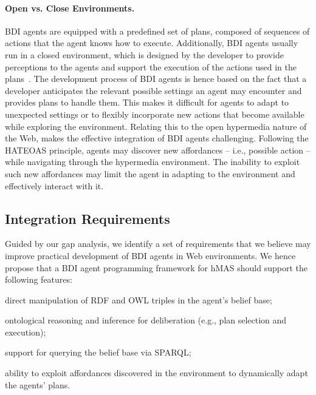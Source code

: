 \documentclass[
]{ceurart}
\begin{document}
\paragraph{Open vs. Close Environments.}

\ac{BDI} agents are equipped with a predefined set of plans, composed of sequences of actions that the agent knows how to execute.
%
Additionally, \ac{BDI} agents usually run in a closed environment,
which is designed by the developer to provide perceptions to the agents and
support the execution of the actions used in the plans~\cite{weyns2007aamas}.
%
The development process of \ac{BDI} agents is hence based on the fact that a developer anticipates
the relevant possible settings an agent may encounter and provides plans to handle them.
%
This makes it difficult for agents to adapt to unexpected settings or to flexibly incorporate new actions that become available while exploring the environment.
%
Relating this to the open hypermedia nature of the Web, makes the effective integration of \ac{BDI} agents challenging.
%
Following the \ac{HATEOAS} principle, agents may discover new affordances
-- i.e., possible action --
while navigating through the hypermedia environment.
%
The inability to exploit such new affordances may limit the agent in adapting to the environment and effectively interact with it.

\subsection{Integration Requirements}
\label{sec:integrating-bdi-hypermedia}

Guided by our gap analysis,
we identify a set of requirements that we believe may improve practical development of \ac{BDI} agents in Web environments.
%
We hence propose that a \ac{BDI} agent programming framework for \ac{hMAS} should support the following features:
%
\begin{enumerate*}[label=\textbf{(R\arabic*)}]
  \item direct manipulation of \ac{RDF} and \ac{OWL} triples in the agent's belief base;
  \label{req:direct}

  \item ontological reasoning and inference for deliberation (e.g., plan selection and execution);
  \label{req:reasoning}

  \item support for querying the belief base via \acs{SPARQL};
  \label{req:query}

  \item ability to exploit affordances discovered in the environment to dynamically adapt the agents' plans.
  \label{req:actions}
\end{enumerate*}
\end{document}
